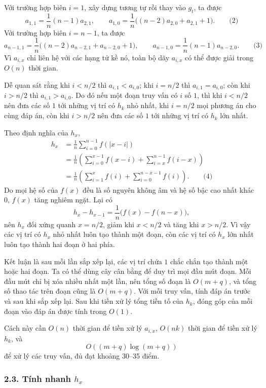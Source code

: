 \documentclass[11pt]{article}
\begin{document}
Với trường hợp biên \(i=1\), xây dựng tương tự rồi thay vào \(g_t\), ta được
\[
  a_{1,1}=\frac1n(n-1)a_{2,1},\qquad
  a_{1,0}=\frac1n\bigl((n-2)a_{2,0}+a_{2,1}+1\bigr). \qquad\text{(2)}
\]
Với trường hợp biên \(i=n-1\), ta được
\[
  a_{n-1,1}=\frac1n\bigl((n-2)a_{n-2,1}+a_{n-2,0}+1\bigr),\qquad
  a_{n-1,0}=\frac1n(n-1)a_{n-2,0}. \qquad\text{(3)}
\]
Vì \(a_{i,x}\) chỉ liên hệ với các hạng tử kề nó, toàn bộ dãy \(a_{i,x}\) có
thể được giải trong \(O(n)\) thời gian.

Dễ quan sát rằng khi \(i<n/2\) thì \(a_{i,1}<a_{i,0}\); khi \(i=n/2\) thì
\(a_{i,1}=a_{i,0}\); còn khi \(i>n/2\) thì \(a_{i,1}>a_{i,0}\). Do đó nếu một
đoạn truy vấn có \(i\) số \(1\), thì khi \(i<n/2\) nên đưa các số \(1\) tới
những vị trí có \(h_k\) nhỏ nhất, khi \(i=n/2\) mọi phương án cho cùng đáp án,
còn khi \(i>n/2\) nên đưa các số \(1\) tới những vị trí có \(h_k\) lớn nhất.

Theo định nghĩa của \(h_x\),
\[
\begin{aligned}
  h_x&=\frac1n\sum_{i=0}^{n-1} f(|x-i|)\\
     &=\frac1n\left(\sum_{i=0}^{x-1}f(x-i)+\sum_{i=x}^{n-1}f(i-x)\right)\\
     &=\frac1n\left(\sum_{i=1}^{x}f(i)+\sum_{i=0}^{n-x-1}f(i)\right). \qquad\text{(4)}
\end{aligned}
\]
Do mọi hệ số của \(f(x)\) đều là số nguyên không âm và hệ số bậc cao nhất khác
0, \(f(x)\) tăng nghiêm ngặt. Lại có
\[
  h_x-h_{x-1}=\frac1n\bigl(f(x)-f(n-x)\bigr),
\]
nên \(h_x\) đối xứng quanh \(x=n/2\), giảm khi \(x<n/2\) và tăng khi
\(x>n/2\). Vì vậy các vị trí có \(h_x\) nhỏ nhất luôn tạo thành một đoạn, còn
các vị trí có \(h_x\) lớn nhất luôn tạo thành hai đoạn ở hai phía.

Kết luận là sau mỗi lần sắp xếp lại, các vị trí chứa \(1\) chắc chắn tạo thành
một hoặc hai đoạn. Ta có thể dùng cây cân bằng để duy trì mọi đầu mút đoạn.
Mỗi đầu mút chỉ bị xóa nhiều nhất một lần, nên tổng số đoạn là
\(O(m+q)\), và tổng số thao tác trên đoạn cũng là \(O(m+q)\). Với mỗi truy
vấn, tính đáp án trước và sau khi sắp xếp lại. Sau khi tiền xử lý tổng tiền tố
của \(h_k\), đóng góp của mỗi đoạn vào đáp án được tính trong \(O(1)\).

Cách này cần \(O(n)\) thời gian để tiền xử lý \(a_{i,x}\),
\(O(nk)\) thời gian để tiền xử lý \(h_k\), và
\[
  O((m+q)\log(m+q))
\]
để xử lý các truy vấn, đủ đạt khoảng 30--35 điểm.

\subsubsection*{2.3. Tính nhanh \(h_x\)}
\end{document}
